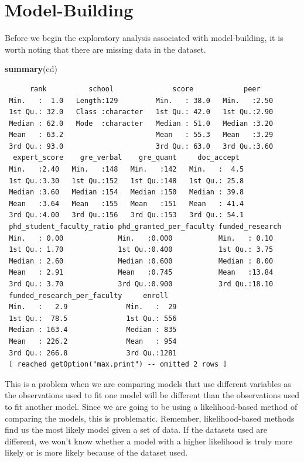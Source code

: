 \documentclass[]{book}
\newenvironment{Shaded}{\begin{snugshade}}{\end{snugshade}}
\newcommand{\KeywordTok}[1]{\textcolor[rgb]{0.13,0.29,0.53}{\textbf{#1}}}
\newcommand{\NormalTok}[1]{#1}
\begin{document}
\hypertarget{model-building}{%
\section{Model-Building}\label{model-building}}

Before we begin the exploratory analysis associated with model-building, it is worth noting that there are missing data in the dataset.

\begin{Shaded}
\begin{Highlighting}[]
\KeywordTok{summary}\NormalTok{(ed)}
\end{Highlighting}
\end{Shaded}

\begin{verbatim}
      rank          school              score            peer     
 Min.   :  1.0   Length:129         Min.   : 38.0   Min.   :2.50  
 1st Qu.: 32.0   Class :character   1st Qu.: 42.0   1st Qu.:2.90  
 Median : 62.0   Mode  :character   Median : 51.0   Median :3.20  
 Mean   : 63.2                      Mean   : 55.3   Mean   :3.29  
 3rd Qu.: 93.0                      3rd Qu.: 63.0   3rd Qu.:3.60  
  expert_score    gre_verbal    gre_quant     doc_accept   
 Min.   :2.40   Min.   :148   Min.   :142   Min.   :  4.5  
 1st Qu.:3.30   1st Qu.:152   1st Qu.:148   1st Qu.: 25.8  
 Median :3.60   Median :154   Median :150   Median : 39.8  
 Mean   :3.64   Mean   :155   Mean   :151   Mean   : 41.4  
 3rd Qu.:4.00   3rd Qu.:156   3rd Qu.:153   3rd Qu.: 54.1  
 phd_student_faculty_ratio phd_granted_per_faculty funded_research
 Min.   : 0.00             Min.   :0.000           Min.   : 0.10  
 1st Qu.: 1.70             1st Qu.:0.400           1st Qu.: 3.75  
 Median : 2.60             Median :0.600           Median : 8.00  
 Mean   : 2.91             Mean   :0.745           Mean   :13.84  
 3rd Qu.: 3.70             3rd Qu.:0.900           3rd Qu.:18.10  
 funded_research_per_faculty     enroll    
 Min.   :   2.9              Min.   :  29  
 1st Qu.:  78.5              1st Qu.: 556  
 Median : 163.4              Median : 835  
 Mean   : 226.2              Mean   : 954  
 3rd Qu.: 266.8              3rd Qu.:1281  
 [ reached getOption("max.print") -- omitted 2 rows ]
\end{verbatim}

This is a problem when we are comparing models that use different variables as the observations used to fit one model will be different than the observations used to fit another model. Since we are going to be using a likelihood-based method of comparing the models, this is problematic. Remember, likelihood-based methods find us the most likely model given a set of data. If the datasets used are different, we won't know whether a model with a higher likelihood is truly more likely or is more likely because of the dataset used.
\end{document}
